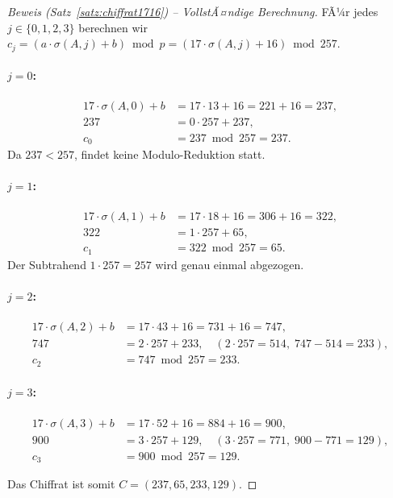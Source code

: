 ﻿\documentclass[a4paper,12pt]{scrreprt}
\theoremstyle{definition}
\begin{document}
\begin{proof}[Beweis (Satz~\ref{satz:chiffrat1716}) -- VollstÃ¤ndige Berechnung]
FÃ¼r jedes $j \in \{0,1,2,3\}$ berechnen wir $c_j = (a \cdot \sigma(A,j) + b) \bmod p = (17 \cdot \sigma(A,j) + 16) \bmod 257$.

\paragraph{$j = 0$:}
\begin{align*}
17 \cdot \sigma(A,0) + b &= 17 \cdot 13 + 16 = 221 + 16 = 237, \\
237 &= 0 \cdot 257 + 237, \\
c_0 &= 237 \bmod 257 = 237.
\end{align*}
Da $237 < 257$, findet keine Modulo-Reduktion statt.

\paragraph{$j = 1$:}
\begin{align*}
17 \cdot \sigma(A,1) + b &= 17 \cdot 18 + 16 = 306 + 16 = 322, \\
322 &= 1 \cdot 257 + 65, \\
c_1 &= 322 \bmod 257 = 65.
\end{align*}
Der Subtrahend $1 \cdot 257 = 257$ wird genau einmal abgezogen.

\paragraph{$j = 2$:}
\begin{align*}
17 \cdot \sigma(A,2) + b &= 17 \cdot 43 + 16 = 731 + 16 = 747, \\
747 &= 2 \cdot 257 + 233, \quad (2 \cdot 257 = 514,\; 747 - 514 = 233), \\
c_2 &= 747 \bmod 257 = 233.
\end{align*}

\paragraph{$j = 3$:}
\begin{align*}
17 \cdot \sigma(A,3) + b &= 17 \cdot 52 + 16 = 884 + 16 = 900, \\
900 &= 3 \cdot 257 + 129, \quad (3 \cdot 257 = 771,\; 900 - 771 = 129), \\
c_3 &= 900 \bmod 257 = 129.
\end{align*}

Das Chiffrat ist somit $C = (237, 65, 233, 129)$.
\end{proof}
\end{document}
